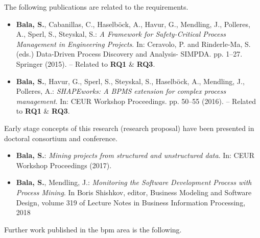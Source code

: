 \noindent The following publications are related to the requirements.
\begin{itemize}
	
\item \textbf{Bala, S.}, Cabanillas, C., Haselböck, A., Havur, G., Mendling, J., Polleres, A., Sperl, S., Steyskal, S.: \textit{A Framework for Safety-Critical Process Management in Engineering Projects}. In: Ceravolo, P. and Rinderle-Ma, S. (eds.) Data-Driven Process Discovery and Analysis- SIMPDA. pp. 1--27. Springer (2015). \cite[]{Bala2017} -- Related to \textbf{RQ1} \& \textbf{RQ3}.
	
\item \textbf{Bala, S.}, Havur, G., Sperl, S., Steyskal, S., Haselböck, A., Mendling, J., Polleres, A.: \textit{SHAPEworks: A BPMS extension for complex process management}. In: CEUR Workshop Proceedings. pp. 50--55 (2016). \cite[]{Bala2016} -- Related to \textbf{RQ1} \& \textbf{RQ3}.
	
\end{itemize}

\noindent Early stage concepts of this research (research proposal) have been presented in doctoral consortium and conference.
\begin{itemize}
	\item \textbf{Bala, S.}: \textit{Mining projects from structured and unstructured data}. In: CEUR Workshop Proceedings (2017). \cite[]{Bala2017b}

	\item \textbf{Bala, S.}, Mendling, J.: \textit{Monitoring the Software Development Process
		with Process Mining}. In Boris Shishkov, editor, Business Modeling and Software
	Design, volume 319 of Lecture Notes in Business Information Processing, 2018 \citep{Bala2018b} 	
\end{itemize}	
	

\noindent Further work published in the \gls{bpm} area is the following.

